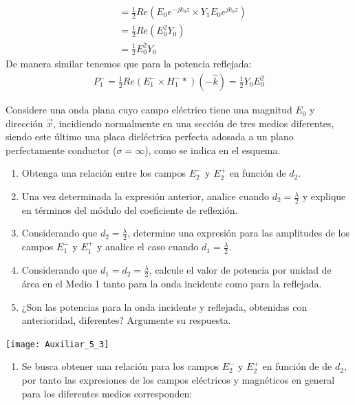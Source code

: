 \documentclass[
  11pt,
  letterpaper,
   addpoints,
   answers
  ]{exam}
\begin{document}
\begin{questions}
\begin{solution}
\begin{enumerate}
\begin{align}
                         &=\frac{1}{2}Re( E_{0}e^{-jk_{0}z} \times Y_{1}E_{0}e^{jk_{0}z})\\
                         &= \frac{1}{2}Re(E_{0}^{2}Y_{0})\\
                         &= \frac{1}{2}E_{0}^{2}Y_{0}
            \end{align}
            De manera similar tenemos que para la potencia reflejada:
            \begin{align}
                P_{1}^{-} = \frac{1}{2}Re(E_{1}^{-} \times H_{1}^{-}*) (-\hat{k})= \frac{1}{2}Y_{0}E_{0}^{2}
            \end{align}
         \end{enumerate}
    \end{solution}
    \question  Considere una onda plana cuyo campo eléctrico tiene una magnitud \(E_0\) y dirección \(\Vec{x}\), incidiendo normalmente en una sección de tres medios diferentes, siendo este último una placa dieléctrica perfecta adosada a un plano perfectamente conductor (\(\sigma = \infty\)), como se indica en el esquema.
    \begin{enumerate}
        \item Obtenga una relación entre los campos \(E^{-}_{2}\) y \(E^{+}_{2}\) en función de \(d_2\).
        \item Una vez determinada la expresión anterior, analice cuando \(d_{2} = \frac{\lambda}{2}\) y explique en términos del módulo del coeficiente de reflexión.
        \item Considerando que \(d_{2} = \frac{\lambda}{2}\), determine una expresión para las amplitudes de los campos \(E^{-}_{1}\) y \(E^{+}_{1}\) y analice el caso cuando \(d_{1} = \frac{\lambda}{2}\).
        \item Considerando que \(d_{1} = d_{2} = \frac{\lambda}{2}\), calcule el valor de potencia por unidad de área en el Medio 1 tanto para la onda incidente como para la reflejada.
        \item ¿Son las potencias para la onda incidente y reflejada, obtenidas con anterioridad, diferentes? Argumente su respuesta.
    \end{enumerate}
    \begin{center}
        \texttt{[image: Auxiliar\_5\_3]}
      \end{center}
    \begin{solution}
        \begin{enumerate}
            \item Se busca obtener una relación para los campos $E_{2}^{-}$ y  $E_{2}^{+}$ en función de de $d_{2}$, por tanto las expresiones de los campos eléctricos y magnéticos en general para los diferentes medios corresponden:

\end{enumerate}
\end{solution}
\end{questions}
\end{document}
